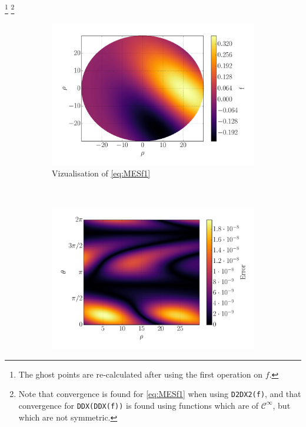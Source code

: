 %
\footnote{The ghost points are re-calculated after using the first operation on $f$.}
\footnote{Note that convergence is found for \cref{eq:MESf1} when using \texttt{D2DX2(f)}, and that convergence for \texttt{DDX(DDX(f))} is found using functions which are of $\mathcal{C}^\infty$, but which are not symmetric.\label{foot:DDXDDX}}
%
\begin{figure}[t!]
    \centering
    \begin{subfigure}[t]{0.45\textwidth}
        \centering
        \includegraphics[width=1.0\textwidth]{fig/f}
        \caption{Vizualisation of \cref{eq:MESf1}}
        \label{fig:typicalMES}
    \end{subfigure}%
    ~
    \begin{subfigure}[t]{0.45\textwidth}
        \centering
        \includegraphics[width=1.0\textwidth]{fig/err}

\end{subfigure}
\end{figure}
